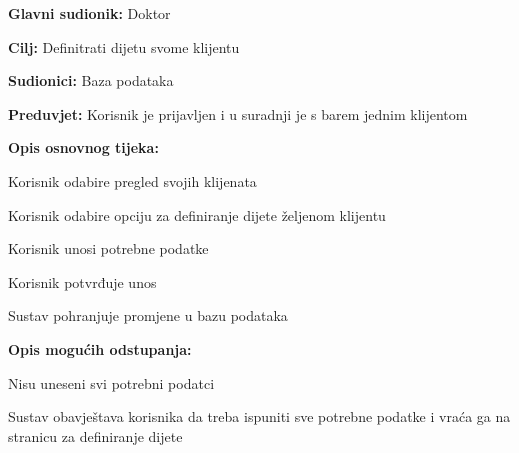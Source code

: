 			
					\noindent {}
					\begin{packed_item}
						
						\item \textbf{Glavni sudionik:} Doktor
						\item  \textbf{Cilj:} Definitrati dijetu svome klijentu
						\item  \textbf{Sudionici:} Baza podataka
						\item  \textbf{Preduvjet:} Korisnik je prijavljen i u suradnji je s barem jednim klijentom
						\item  \textbf{Opis osnovnog tijeka:}
						
						\item[] \begin{packed_enum}
							
							\item Korisnik odabire pregled svojih klijenata
							\item Korisnik odabire opciju za definiranje dijete željenom klijentu
							\item Korisnik unosi potrebne podatke
							\item Korisnik potvrđuje unos
							\item Sustav pohranjuje promjene u bazu podataka
							
						\end{packed_enum}
					
						\item  \textbf{Opis mogućih odstupanja:}
						
						\item[] \begin{packed_item}
							
							\item[4.a] Nisu uneseni svi potrebni podatci
							\item[] \begin{packed_enum}
								
								\item Sustav obavještava korisnika da treba ispuniti sve potrebne podatke i vraća ga na stranicu za definiranje dijete
								
							\end{packed_enum}
							
						\end{packed_item}
						
					\end{packed_item}
				
